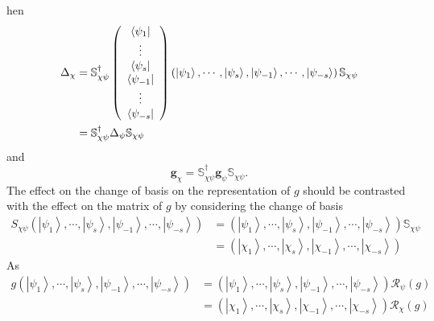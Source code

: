 \documentclass[aps,preprint]{revtex4}%
\begin{document}
hen%
\begin{align}
\Delta_{\chi} &  =\mathbb{S}_{\chi\psi}^{\dagger}\left(
\begin{array}
[c]{c}%
\left\langle \psi_{1}\right\vert \\
\vdots\\
\left\langle \psi_{s}\right\vert \\
\left\langle \psi_{-1}\right\vert \\
\vdots\\
\left\langle \psi_{-s}\right\vert
\end{array}
\right)  \left(  \left\vert \psi_{1}\right\rangle ,\cdots,\left\vert \psi
_{s}\right\rangle ,\left\vert \psi_{-1}\right\rangle ,\cdots,\left\vert
\psi_{-s}\right\rangle \right)  \mathbb{S}_{\chi\psi}\nonumber\\
&  =\mathbb{S}_{\chi\psi}^{\dagger}\Delta_{\psi}\mathbb{S}_{\chi\psi}%
\end{align}
and
\begin{equation}
\mathbf{g}_{\chi}=\mathbb{S}_{\chi\psi}^{\dagger}\mathbf{g}_{\psi}%
\mathbb{S}_{\chi\psi}.
\end{equation}
The effect on the change of basis on the representation of $g$ should be
contrasted with the effect on the matrix of $g$ by considering the change of
basis
\begin{align}
S_{\chi\psi}\left(  \left\vert \psi_{1}\right\rangle ,\cdots,\left\vert
\psi_{s}\right\rangle ,\left\vert \psi_{-1}\right\rangle ,\cdots,\left\vert
\psi_{-s}\right\rangle \right)   &  =\left(  \left\vert \psi_{1}\right\rangle
,\cdots,\left\vert \psi_{s}\right\rangle ,\left\vert \psi_{-1}\right\rangle
,\cdots,\left\vert \psi_{-s}\right\rangle \right)  \mathbb{S}_{\chi\psi
}\nonumber\\
&  =\left(  \left\vert \chi_{1}\right\rangle ,\cdots,\left\vert \chi
_{s}\right\rangle ,\left\vert \chi_{-1}\right\rangle ,\cdots,\left\vert
\chi_{-s}\right\rangle \right)
\end{align}
As
\begin{align}
g\left(  \left\vert \psi_{1}\right\rangle ,\cdots,\left\vert \psi
_{s}\right\rangle ,\left\vert \psi_{-1}\right\rangle ,\cdots,\left\vert
\psi_{-s}\right\rangle \right)   &  =\left(  \left\vert \psi_{1}\right\rangle
,\cdots,\left\vert \psi_{s}\right\rangle ,\left\vert \psi_{-1}\right\rangle
,\cdots,\left\vert \psi_{-s}\right\rangle \right)  \mathcal{R}_{\psi}\left(
g\right)  \nonumber\\
&  =\left(  \left\vert \chi_{1}\right\rangle ,\cdots,\left\vert \chi
_{s}\right\rangle ,\left\vert \chi_{-1}\right\rangle ,\cdots,\left\vert
\chi_{-s}\right\rangle \right)  \mathcal{R}_{\chi}\left(  g\right)
\end{align}
\end{document}
